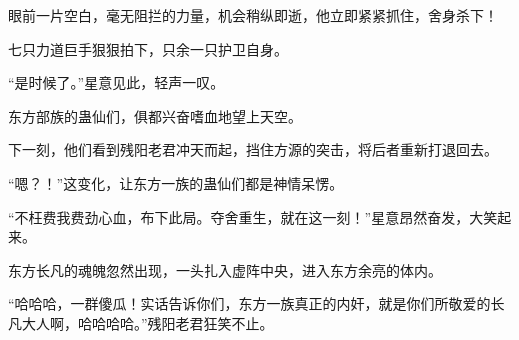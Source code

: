 \begin{this_body}
眼前一片空白，毫无阻拦的力量，机会稍纵即逝，他立即紧紧抓住，舍身杀下！

七只力道巨手狠狠拍下，只余一只护卫自身。

“是时候了。”星意见此，轻声一叹。

东方部族的蛊仙们，俱都兴奋嗜血地望上天空。

下一刻，他们看到残阳老君冲天而起，挡住方源的突击，将后者重新打退回去。

“嗯？！”这变化，让东方一族的蛊仙们都是神情呆愣。

“不枉费我费劲心血，布下此局。夺舍重生，就在这一刻！”星意昂然奋发，大笑起来。

东方长凡的魂魄忽然出现，一头扎入虚阵中央，进入东方余亮的体内。

“哈哈哈，一群傻瓜！实话告诉你们，东方一族真正的内奸，就是你们所敬爱的长凡大人啊，哈哈哈哈。”残阳老君狂笑不止。

\end{this_body}

